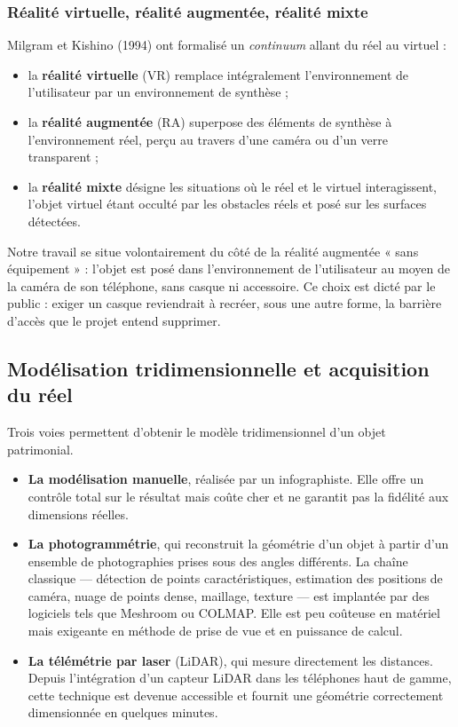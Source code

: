 \subsubsection{Réalité virtuelle, réalité augmentée, réalité mixte}

Milgram et Kishino (1994) ont formalisé un \emph{continuum} allant du réel
au virtuel :

\begin{itemize}
  \item la \textbf{réalité virtuelle} (VR) remplace intégralement
        l'environnement de l'utilisateur par un environnement de synthèse ;
  \item la \textbf{réalité augmentée} (RA) superpose des éléments de synthèse à
        l'environnement réel, perçu au travers d'une caméra ou d'un verre
        transparent ;
  \item la \textbf{réalité mixte} désigne les situations où le réel et le
        virtuel interagissent, l'objet virtuel étant occulté par les obstacles
        réels et posé sur les surfaces détectées.
\end{itemize}

Notre travail se situe volontairement du côté de la réalité augmentée
« sans équipement » : l'objet est posé dans l'environnement de l'utilisateur au
moyen de la caméra de son téléphone, sans casque ni accessoire. Ce choix est
dicté par le public : exiger un casque reviendrait à recréer, sous une autre
forme, la barrière d'accès que le projet entend supprimer.

\subsection{Modélisation tridimensionnelle et acquisition du réel}

Trois voies permettent d'obtenir le modèle tridimensionnel d'un objet
patrimonial.

\begin{itemize}
  \item \textbf{La modélisation manuelle}, réalisée par un infographiste. Elle
        offre un contrôle total sur le résultat mais coûte cher et ne garantit
        pas la fidélité aux dimensions réelles.
  \item \textbf{La photogrammétrie}, qui reconstruit la géométrie d'un objet à
        partir d'un ensemble de photographies prises sous des angles différents.
        La chaîne classique — détection de points caractéristiques, estimation
        des positions de caméra, nuage de points dense, maillage, texture — est
        implantée par des logiciels tels que Meshroom ou COLMAP. Elle est peu
        coûteuse en matériel mais exigeante en méthode de prise de vue et en
        puissance de calcul.
  \item \textbf{La télémétrie par laser} (LiDAR), qui mesure directement les
        distances. Depuis l'intégration d'un capteur LiDAR dans les téléphones
        haut de gamme, cette technique est devenue accessible et fournit une
        géométrie correctement dimensionnée en quelques minutes.
\end{itemize}

